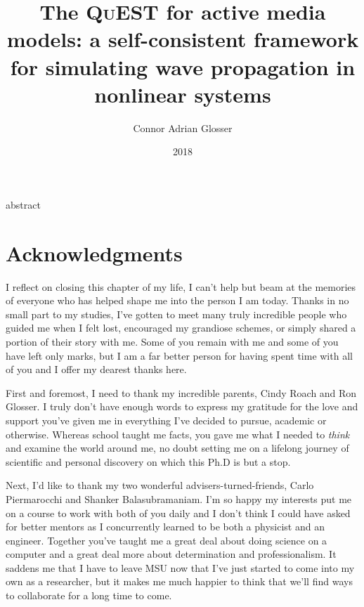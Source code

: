 \documentclass[mixedtoc]{msu-thesis-custom}
\title{The \textsc{QuEST} for active media models: a self-consistent framework for simulating wave propagation in nonlinear systems}
\author{Connor Adrian Glosser}
\date{2018}
\begin{document}
\frontmatter
\maketitlepage

{abstract}

\clearpage

\makecopyrightpage


\makededicationpage

\clearpage
\chapter*{Acknowledgments}
\DoubleSpacing %
 I reflect on closing this chapter of my life, I can't help but beam at the
memories of everyone who has helped shape me into the person I am today. Thanks
in no small part to my studies, I've gotten to meet many truly incredible
people who guided me when I felt lost, encouraged my grandiose schemes, or
simply shared a portion of their story with me. Some of you remain with me and
some of you have left only marks, but I am a far better person for having spent
time with all of you and I offer my dearest thanks here.

First and foremost, I need to thank my incredible parents, Cindy Roach and Ron
Glosser. I truly don't have enough words to express my gratitude for the love
and support you've given me in everything I've decided to pursue, academic or
otherwise.  Whereas school taught me facts, you gave me what I needed to
\emph{think} and examine the world around me, no doubt setting me on a lifelong
journey of scientific and personal discovery on which this Ph.D is but a stop.

Next, I'd like to thank my two wonderful advisers-turned-friends, Carlo
Piermarocchi and Shanker Balasubramaniam.  I'm so happy my interests put me on
a course to work with both of you daily and I don't think I could have asked
for better mentors as I concurrently learned to be both a physicist and an
engineer. Together you've taught me a great deal about doing science on a
computer and a great deal more about determination and professionalism. It
saddens me that I have to leave MSU now that I've just started to come into my
own as a researcher, but it makes me much happier to think that we'll find ways
to collaborate for a long time to come.
\end{document}
